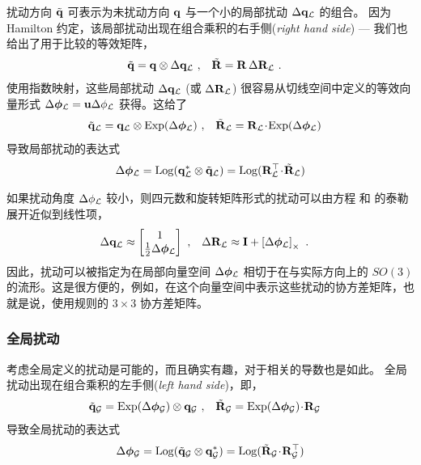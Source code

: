 扰动方向 $\tilde{{\bf q}}$ 可表示为未扰动方向 ${\bf q}$ 与一个小的局部扰动 ${\Delta{\bf q}_{\mathcal{L}}}$ 的组合。 
因为 Hamilton 约定，该局部扰动出现在组合乘积的右手侧(\emph{right hand side}) --- 我们也给出了用于比较的等效矩阵，
%
\begin{align}
\tilde{{\bf q}} &= {\bf q}\otimes{\Delta{\bf q}_{\mathcal{L}}}
~, &
\tilde{{\bf R}} &= {\bf R}\,\Delta{\bf R}_{\mathcal{L}}
~.
\end{align}%
%
使用指数映射，这些局部扰动 $\Delta{\bf q}_{\mathcal{L}}$ (或 $\Delta{\bf R}_{\mathcal{L}}$) 很容易从切线空间中定义的等效向量形式 $\Delta{\bm \phi}_{\mathcal{L}}={\bf u}\Delta\phi_{\mathcal{L}}$ 获得。这给了
%
\begin{align}
\tilde{{\bf q}}_{\mathcal{L}} &= {\bf q}_{\mathcal{L}}\otimes\operatorname*{Exp}(\Delta{\bm \phi}_{\mathcal{L}})
~,& 
\tilde{{\bf R}}_{\mathcal{L}} &= {\bf R}_{\mathcal{L}}\!\cdot\!\operatorname*{Exp}(\Delta{\bm \phi}_{\mathcal{L}})
\end{align}
%
导致局部扰动的表达式 
%
\begin{align}
\Delta{\bm \phi}_{\mathcal{L}} = \operatorname*{Log}({\bf q}_{\mathcal{L}}^*\otimes\tilde{{\bf q}}_{\mathcal{L}}) = \operatorname*{Log}({\bf R}_{\mathcal{L}}^{\top}\!\cdot\!\tilde{{\bf R}}_{\mathcal{L}})
\end{align}
 

如果扰动角度 $\Delta\phi_{\mathcal{L}}$ 较小，则四元数和旋转矩阵形式的扰动可以由方程  和  的泰勒展开近似到线性项，
%
\begin{align}
{\Delta{\bf q}_{\mathcal{L}}}& \approx \begin{bmatrix}
1\\\frac{1}{2}\Delta{\bm \phi}_{\mathcal{L}}
\end{bmatrix}
~,
&
\Delta{\bf R}_{\mathcal{L}}& \approx
{\bf I}+\left[\Delta{\bm \phi}_{\mathcal{L}}\right]_\times
~.
\end{align}%
%
因此，扰动可以被指定为在局部向量空间 $\Delta{\bm \phi}_{\mathcal{L}}$ 相切于在与实际方向上的 $SO(3)$ 的流形。这是很方便的，例如，在这个向量空间中表示这些扰动的协方差矩阵，也就是说，使用规则的 $3\times 3$ 协方差矩阵。

\subsubsection{全局扰动}

考虑全局定义的扰动是可能的，而且确实有趣，对于相关的导数也是如此。 
全局扰动出现在组合乘积的左手侧(\emph{left hand side})，即，
%
%
\begin{align}
\tilde{{\bf q}}_{\mathcal{G}} &= \operatorname*{Exp}(\Delta{\bm \phi}_{\mathcal{G}})\otimes{\bf q}_{\mathcal{G}}
~,& 
\tilde{{\bf R}}_{\mathcal{G}} &= \operatorname*{Exp}(\Delta{\bm \phi}_{\mathcal{G}})\!\cdot\!{\bf R}_{\mathcal{G}}
\end{align}
%
导致全局扰动的表达式 
%
\begin{align}
\Delta{\bm \phi}_{\mathcal{G}} = \operatorname*{Log}(\tilde{{\bf q}}_{\mathcal{G}}\otimes{\bf q}_{\mathcal{G}}^*) = \operatorname*{Log}(\tilde{{\bf R}}_{\mathcal{G}}\!\cdot\!{\bf R}_{\mathcal{G}}^{\top})
\end{align}


